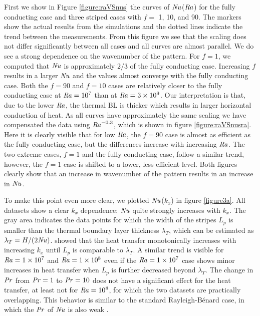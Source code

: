 \documentclass{jfm}
\newcommand\Pran{\mbox{\textit{Pr}}} %
\newcommand\Ray{\mbox{\textit{Ra}}}  %
\newcommand\Nus{\mbox{\textit{Nu}}}  %
\begin{document}
First we show in Figure \ref{figure:raVSnus} the curves of $\Nus$($\Ray$) for
the fully conducting case and three striped cases with $f=$ 1, 10, and 90.
The markers show the actual results from the simulations and the dotted lines
indicate the trend between the measurements.  From this figure we see that the
scaling does not differ significantly between all cases and all curves are
almost parallel.  We do see a strong dependence on the wavenumber of the
pattern.  For $f=1$, we computed that $\Nus$ is approximately $2/3$ of the
fully conducting case.  Increasing $f$ results in a larger $\Nus$ and the
values almost converge with the fully conducting case.  Both the $f=90$ and
$f=10$ cases are relatively closer to the fully conducting case at $\Ray=10^7$
than at $\Ray=3 \times 10^9$. Our interpretation is that, due to the lower
$\Ray$, the thermal BL is thicker which results in larger horizontal
conduction of heat.  As all curves have approximately the same scaling we have
compensated the data using $\Ray^{-0.3}$, which is shown in figure
\ref{figure:raVSnusra}.  Here it is clearly visible that for low $\Ray$, the
$f=90$ case is almost as efficient as the fully conducting case, but the
differences increase with increasing $\Ray$.  The two extreme cases, $f=1$ and
the fully conducting case, follow a similar trend, however, the $f=1$ case is
shifted to a lower, less efficient level.  Both figures clearly show that an
increase in wavenumber of the pattern results in an increase in $\Nus$.


To make this point even more clear, we plotted $\Nus$($k_x$) in figure
\ref{figure3a}.  All datasets show a clear $k_x$ dependence: $\Nus$ quite
strongly increases with $k_x$.  The gray area indicates the data points for
which the width of the stripes $L_p$ is smaller than the thermal boundary
layer thickness $\lambda_T$, which can be estimated as $\lambda_T = H / (2
\Nus)$.  \citeauthor{rip14} showed that the heat transfer monotonically
increases with increasing $k_x$ until $L_p$ is comparable to $\lambda_T$.  A
similar trend is visible for $\Ray=\num{1e7}$ and $\Ray=\num{1e8}$ even if the
$\Ray=\num{1e7}$ case shows minor increases in heat transfer when $L_p$ is
further decreased beyond $\lambda_T$.  The change in $\Pran$ from $\Pran=1$ to
$\Pran=10$ does not have a significant effect for the heat transfer, at least
not for $\Ray = 10^8$, for which the two datasets are practically overlapping.
This behavior is similar to the standard Rayleigh-B\'enard case, in which the
$\Pran$ of $\Nus$ is also weak \citep{ahl09}.
\end{document}
